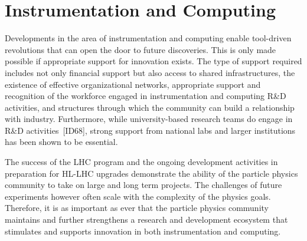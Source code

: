 \documentclass[../report.tex]{subfiles}
\providecommand{\main}{..}
\begin{document}
\chapter{Instrumentation and Computing}
\label{chap:inst}

Developments in the area of instrumentation and computing enable tool-driven revolutions that can open the door to future discoveries.  This is only made possible if appropriate support for innovation exists.  The type of support required includes not only financial support but also access to shared infrastructures, the existence of effective organizational networks, appropriate support and recognition of the workforce engaged in instrumentation and computing R\&D activities, and  structures through which the community can build a relationship with industry.  Furthermore, while university-based research teams do engage in R\&D activities~[ID68], strong support from national labs and larger institutions has been shown to be essential.
 
 The success of the LHC program and the ongoing development activities in preparation for HL-LHC upgrades demonstrate the ability of the particle physics community to take on large and long term projects. The challenges of future experiments however often scale with the complexity of the physics goals.  Therefore, it is as important as ever that the particle physics community maintains and further strengthens a research and development ecosystem that stimulates and supports innovation in both instrumentation and computing.  

%





\end{document}
